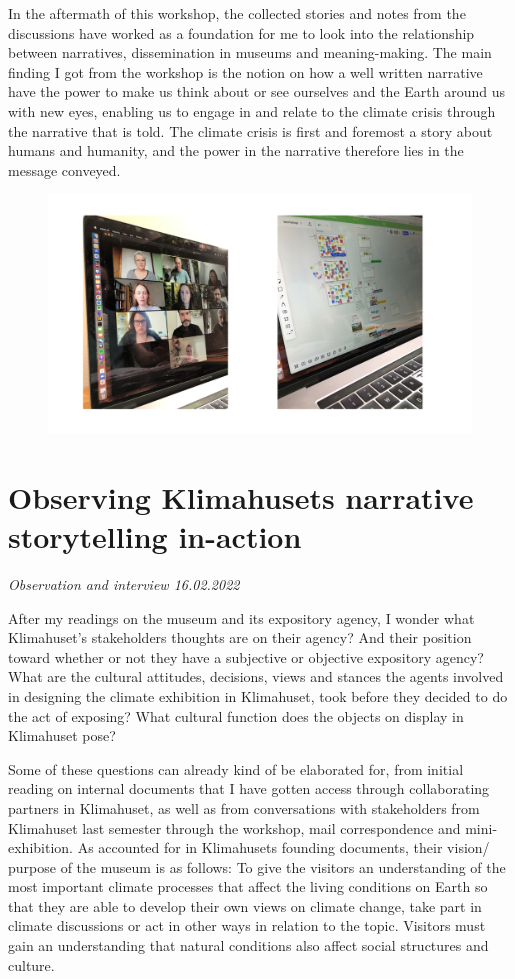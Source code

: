 In the aftermath of this workshop, the collected stories and notes from the discussions have worked as a foundation for me to look into the relationship between narratives, dissemination in museums and meaning-making. The main finding I got from the workshop is the notion on how a well written narrative have the power to make us think about or see ourselves and the Earth around us with new eyes, enabling us to engage in and relate to the climate crisis through the narrative that is told. The climate crisis is first and foremost a story about humans and humanity, and the power in the narrative therefore lies in the message conveyed. 

\begin{figure}[h]
\includegraphics[width=13cm]{pictures/narrative_workshop.png}
\centering 
\end{figure}


\section{Observing Klimahusets narrative storytelling in-action}
\par
\emph{Observation and interview 16.02.2022}
\par

After my readings on the museum and its expository agency, I wonder what Klimahuset’s stakeholders thoughts are on their agency? And their position toward whether or not they have a subjective or objective expository agency? What are the cultural attitudes, decisions, views and stances the agents involved in designing the climate exhibition in Klimahuset, took before they decided to do the act of exposing? What cultural function does the objects on display in Klimahuset pose? 

Some of these questions can already kind of be elaborated for, from initial reading on internal documents that I have gotten access through collaborating partners in Klimahuset, as well as from conversations with stakeholders from Klimahuset last semester through the workshop, mail correspondence and mini-exhibition. As accounted for in Klimahusets founding documents, their vision/ purpose of the museum is as follows:
To give the visitors an understanding of the most important climate processes that affect the living conditions on Earth so that they are able to develop their own views on climate change, take part in climate discussions or act in other ways in relation to the topic.
Visitors must gain an understanding that natural conditions also affect social structures and culture.
	
